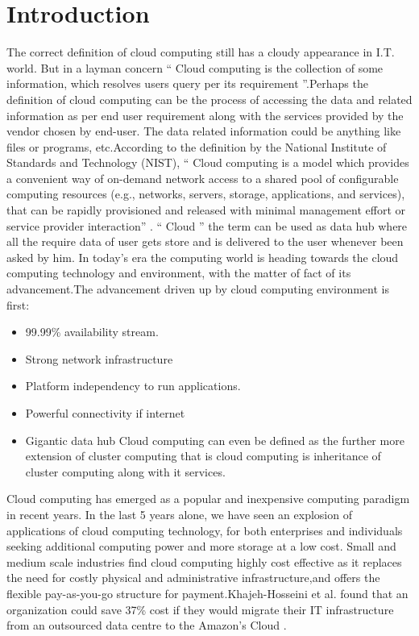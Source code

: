 \documentclass[conference,one column]{IEEEtran}
\begin{document}
\section*{Introduction}
The correct definition of cloud computing still has a cloudy appearance in I.T. world. But in a layman concern “ Cloud computing is the collection of some information, which resolves users query per its requirement ”.Perhaps the definition of cloud computing can be the process of accessing the data and related information as per end user requirement along with the services provided by the vendor chosen by end-user. The data related information could be anything like files or programs, etc.According to the deﬁnition by the National Institute of Standards and Technology (NIST), “ Cloud computing is a model which provides a convenient way of on-demand network access to a shared pool of conﬁgurable computing resources (e.g., networks, servers, storage, applications, and services), that can be rapidly provisioned and released with minimal management effort or service provider interaction” \cite{mell2009draft}. “ Cloud ” the term can be used as data hub where all the require data of user gets store and is delivered to the user whenever been asked by him. In today's era the computing world is heading towards the cloud computing technology and environment, with the matter of fact of its advancement.The advancement driven up by cloud computing environment is first:
 \begin{itemize}
 
  \item  99.99\% availability stream\cite{reilly2011cloud}.
  \item   Strong network infrastructure
   \item  Platform independency to run applications.
   \item   Powerful connectivity if internet
 \item  Gigantic data hub Cloud computing can even be defined as the further more extension of cluster computing that is cloud computing is inheritance of cluster computing along with it services. 
 
\end{itemize}
 Cloud computing has emerged as a popular and inexpensive computing paradigm in recent years. In the last 5 years alone, we have seen an explosion of applications of cloud computing technology, for both enterprises and individuals seeking additional computing power and more storage at a low cost. Small and medium scale industries ﬁnd cloud computing highly cost effective as it replaces the need for costly physical and administrative infrastructure,and offers the ﬂexible pay-as-you-go structure for payment.Khajeh-Hosseini et al. found that an organization could save 37\% cost if they would migrate their IT infrastructure from an outsourced data centre to the Amazon's Cloud\cite{khajeh2010cloud} .\\
\end{document}
